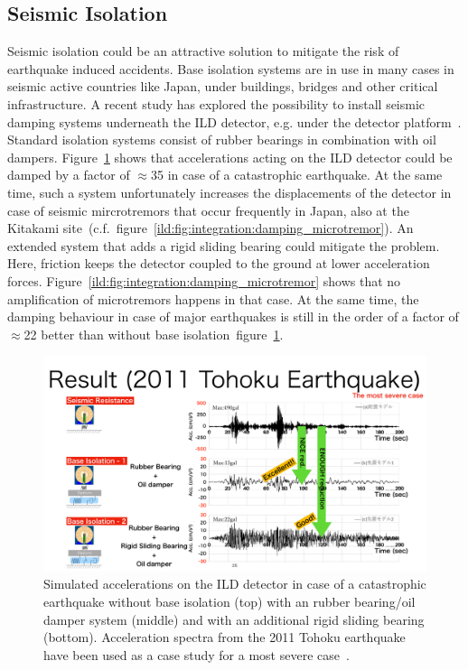 \subsection{Seismic Isolation}

Seismic isolation could be an attractive solution to mitigate the risk of earthquake induced accidents. Base isolation systems are in use in many cases in seismic active countries like Japan, under buildings, bridges and other critical infrastructure. A recent study has explored the possibility to install seismic damping systems underneath the ILD detector, e.g. under the detector platform~\cite{ild:bib:Seismic_Damping}. Standard isolation systems consist of rubber bearings in combination with oil dampers. Figure~\ref{ild:fig:integration:damping_earthquake} shows that accelerations acting on the ILD detector could be damped by a factor of $\approx$35 in case of a catastrophic earthquake. At the same time, such a system unfortunately increases the displacements of the detector in case of seismic mircrotremors that occur frequently in Japan, also at the Kitakami site~(c.f.~figure~\ref{ild:fig:integration:damping_microtremor}). An extended system that adds a rigid sliding bearing could mitigate the problem. Here, friction keeps the detector coupled to the ground at lower acceleration forces. Figure~\ref{ild:fig:integration:damping_microtremor} shows that no amplification of microtremors happens in that case. At the same time, the damping behaviour in case of major earthquakes is still in the order of a factor of $\approx$22 better than without base isolation~{figure~\ref{ild:fig:integration:damping_earthquake}}. 
\begin{figure}[h!]
\centering
\includegraphics[width=0.8\hsize]{Integration/fig/Damping_Earthquake.pdf}
\caption{\label{ild:fig:integration:damping_earthquake}Simulated accelerations on the ILD detector in case of a catastrophic earthquake without base isolation (top) with an rubber bearing/oil damper system (middle) and with an additional rigid sliding bearing (bottom). Acceleration spectra from the 2011 Tohoku earthquake have been used as a case study for a most severe case~\cite{ild:bib:Seismic_Damping}.}
\end{figure}

